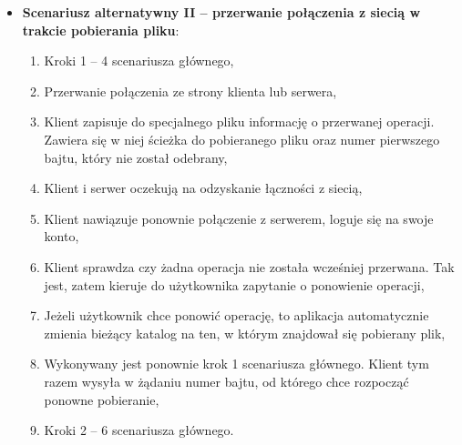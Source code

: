 \documentclass[8pt,a4paper]{article}
\begin{document}
\begin{itemize}
    \item \textbf{Scenariusz alternatywny II -- przerwanie połączenia z siecią w trakcie pobierania pliku}:
    \begin{enumerate}
        \item Kroki 1 -- 4 scenariusza głównego,
        \item Przerwanie połączenia ze strony klienta lub serwera,
        \item Klient zapisuje do specjalnego pliku informację o przerwanej operacji. Zawiera się w niej ścieżka do pobieranego pliku oraz numer pierwszego bajtu, który nie został odebrany,
        \item Klient i serwer oczekują na odzyskanie łączności z siecią,
        \item Klient nawiązuje ponownie połączenie z serwerem, loguje się na swoje konto,
        \item Klient sprawdza czy żadna operacja nie została wcześniej przerwana. Tak jest, zatem kieruje do użytkownika zapytanie o ponowienie operacji,
        \item Jeżeli użytkownik chce ponowić operację, to aplikacja automatycznie zmienia bieżący katalog na ten, w którym znajdował się pobierany plik,
        \item Wykonywany jest ponownie krok 1 scenariusza głównego. Klient tym razem wysyła w żądaniu numer bajtu, od którego chce rozpocząć ponowne pobieranie,
        \item Kroki 2 -- 6 scenariusza głównego.
    \end{enumerate}
\end{itemize}
\end{document}

